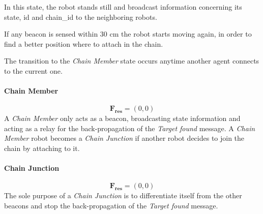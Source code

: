 In this state, the robot stands still and broadcast information concerning its state, id and chain\_id to the neighboring robots.

If any beacon is sensed within 30 cm the robot starts moving again, in order to 
find a better position where to attach in the chain.

The transition to the \emph{Chain Member} state occurs anytime another agent connects to the current one.

\paragraph{Chain Member}
\begin{equation}
  \mathbf{F_{res}} = (0,0)
\end{equation}
A \emph{Chain Member} only acts as a beacon, broadcasting state information and acting as a relay for the back-propagation of the \emph{Target found} message.
A \emph{Chain Member} robot becomes a \emph{Chain Junction} if another robot decides to 
join the chain by attaching to it.

\paragraph{Chain Junction}
\begin{equation}
  \mathbf{F_{res}} = (0,0)
\end{equation}
The sole purpose of a \emph{Chain Junction} is to differentiate itself from the other beacons and stop the back-propagation of the \emph{Target found} message.

